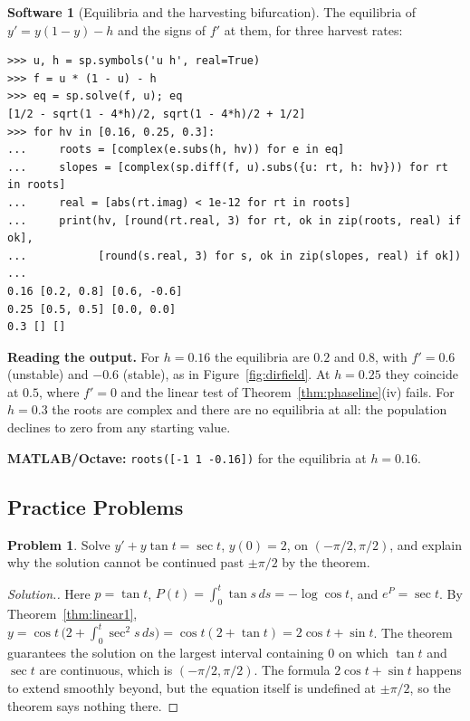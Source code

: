 \documentclass[11pt,a4paper]{article}
\numberwithin{equation}{section}
\theoremstyle{definition}
\newtheorem{software}[thm]{Software}
\newtheorem{problemx}{Problem}[subsection]
\newenvironment{problem}{\begin{problemx}}{\end{problemx}}
\newenvironment{solution}
  {\renewcommand{\qedsymbol}{}\begin{proof}[\textit{Solution}.]}
  {\end{proof}}
\begin{document}
\begin{software}[Equilibria and the harvesting bifurcation]
\label{sw:harvest}
The equilibria of $y' = y(1 - y) - h$ and the signs of $f'$ at them, for three harvest rates:
{\small\begin{verbatim}
>>> u, h = sp.symbols('u h', real=True)
>>> f = u * (1 - u) - h
>>> eq = sp.solve(f, u); eq
[1/2 - sqrt(1 - 4*h)/2, sqrt(1 - 4*h)/2 + 1/2]
>>> for hv in [0.16, 0.25, 0.3]:
...     roots = [complex(e.subs(h, hv)) for e in eq]
...     slopes = [complex(sp.diff(f, u).subs({u: rt, h: hv})) for rt in roots]
...     real = [abs(rt.imag) < 1e-12 for rt in roots]
...     print(hv, [round(rt.real, 3) for rt, ok in zip(roots, real) if ok],
...           [round(s.real, 3) for s, ok in zip(slopes, real) if ok])
...
0.16 [0.2, 0.8] [0.6, -0.6]
0.25 [0.5, 0.5] [0.0, 0.0]
0.3 [] []
\end{verbatim}}
\textbf{Reading the output.} For $h = 0.16$ the equilibria are $0.2$ and $0.8$, with $f' = 0.6$ (unstable) and $-0.6$ (stable), as in Figure~\ref{fig:dirfield}. At $h = 0.25$ they coincide at $0.5$,
where $f' = 0$ and the linear test of Theorem~\ref{thm:phaseline}(iv) fails. For $h = 0.3$ the roots are complex and there are no equilibria at all: the population
declines to zero from any starting value.

\textbf{MATLAB/Octave:} \texttt{roots([-1 1 -0.16])} for the equilibria at $h = 0.16$.
\end{software}

\subsection{Practice Problems}

\begin{problem}
Solve $y' + y\tan t = \sec t$, $y(0) = 2$, on $(-\pi/2, \pi/2)$, and explain why the solution cannot be continued past $\pm\pi/2$ by the theorem.
\end{problem}

\begin{solution}
Here $p = \tan t$, $P(t) = \int_0^t\tan s\,ds = -\log\cos t$, and $e^{P} = \sec t$. By Theorem~\ref{thm:linear1}, $y = \cos t\,\bigl(2 + \int_0^t\sec^2s\,ds\bigr) = \cos t(2 + \tan t) = 2\cos t + \sin t$. The theorem
guarantees the solution on the largest interval containing $0$ on which $\tan t$ and $\sec t$ are continuous, which is $(-\pi/2, \pi/2)$. The formula $2\cos t + \sin t$ happens to extend
smoothly beyond, but the equation itself is undefined at $\pm\pi/2$, so the theorem says nothing there.
\end{solution}
\end{document}
